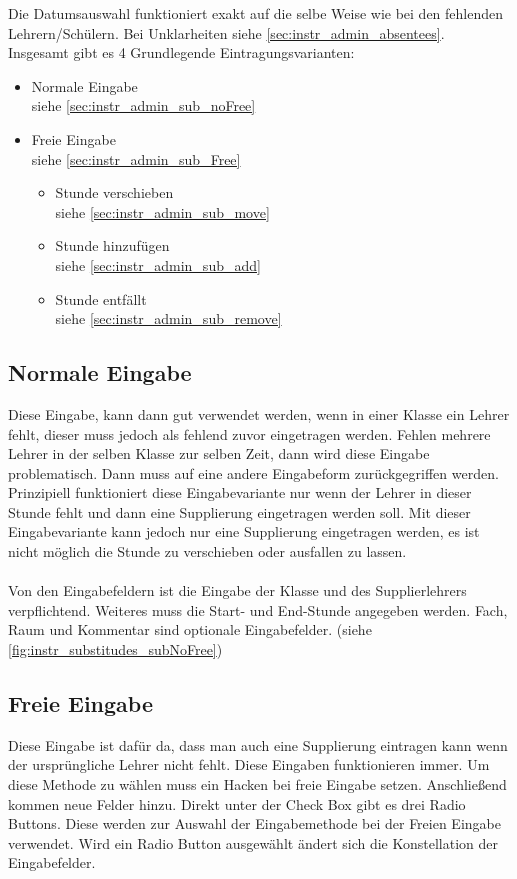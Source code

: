 Die Datumsauswahl funktioniert exakt auf die selbe Weise wie bei den fehlenden Lehrern/Schülern. Bei Unklarheiten siehe \autoref{sec:instr_admin_absentees}.\\
Insgesamt gibt es 4 Grundlegende Eintragungsvarianten:
\begin{itemize}
	\item Normale Eingabe\\
		siehe \autoref{sec:instr_admin_sub_noFree}
	\item Freie Eingabe\\
		siehe \autoref{sec:instr_admin_sub_Free}
		\begin{itemize}
			\item Stunde verschieben\\
				siehe \autoref{sec:instr_admin_sub_move}
			\item Stunde hinzufügen\\
				siehe \autoref{sec:instr_admin_sub_add}
			\item Stunde entfällt\\
				siehe \autoref{sec:instr_admin_sub_remove}
		\end{itemize}
\end{itemize}
\subsection{Normale Eingabe}\label{sec:instr_admin_sub_noFree}
Diese Eingabe, kann dann gut verwendet werden, wenn in einer Klasse ein Lehrer fehlt, dieser muss jedoch als fehlend zuvor eingetragen werden. Fehlen mehrere Lehrer in der selben Klasse zur selben Zeit, dann wird diese Eingabe problematisch. Dann muss auf eine andere Eingabeform zurückgegriffen werden.\\
Prinzipiell funktioniert diese Eingabevariante nur wenn der Lehrer in dieser Stunde fehlt und dann eine Supplierung eingetragen werden soll. Mit dieser Eingabevariante kann jedoch nur eine Supplierung eingetragen werden, es ist nicht möglich die Stunde zu verschieben oder ausfallen zu lassen.\\\\
Von den Eingabefeldern ist die Eingabe der Klasse und des Supplierlehrers verpflichtend. Weiteres muss die Start- und End-Stunde angegeben werden. Fach, Raum und Kommentar sind optionale Eingabefelder. (siehe \autoref{fig:instr_substitudes_subNoFree})
\subsection{Freie Eingabe}\label{sec:instr_admin_sub_Free}
Diese Eingabe ist dafür da, dass man auch eine Supplierung eintragen kann wenn der ursprüngliche Lehrer nicht fehlt. Diese Eingaben funktionieren immer. Um diese Methode zu wählen muss ein Hacken bei freie Eingabe setzen. Anschließend kommen neue Felder hinzu. Direkt unter der Check Box gibt es drei Radio Buttons. Diese werden zur Auswahl der Eingabemethode bei der Freien Eingabe verwendet. Wird ein Radio Button ausgewählt ändert sich die Konstellation der Eingabefelder.
